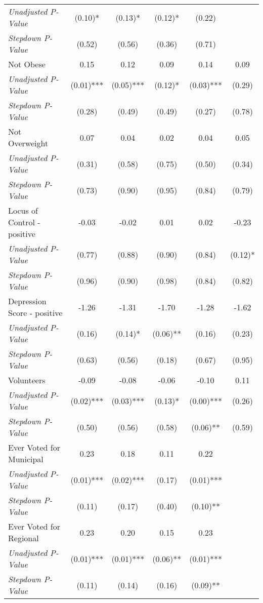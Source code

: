 \begin{tabular}{l c c c c c}
\quad \textit{Unadjusted P-Value} & (0.10)* & (0.13)* & (0.12)* & (0.22) & \\
\quad \textit{Stepdown P-Value} & (0.52) & (0.56) & (0.36) & (0.71) & \\
Not Obese & 0.15 & 0.12 & 0.09 & 0.14 & 0.09 \\
\quad \textit{Unadjusted P-Value} & (0.01)*** & (0.05)*** & (0.12)* & (0.03)*** & (0.29) \\
\quad \textit{Stepdown P-Value} & (0.28) & (0.49) & (0.49) & (0.27) & (0.78) \\
Not Overweight & 0.07 & 0.04 & 0.02 & 0.04 & 0.05 \\
\quad \textit{Unadjusted P-Value} & (0.31) & (0.58) & (0.75) & (0.50) & (0.34) \\
\quad \textit{Stepdown P-Value} & (0.73) & (0.90) & (0.95) & (0.84) & (0.79) \\
Locus of Control - positive & -0.03 & -0.02 & 0.01 & 0.02 & -0.23 \\
\quad \textit{Unadjusted P-Value} & (0.77) & (0.88) & (0.90) & (0.84) & (0.12)* \\
\quad \textit{Stepdown P-Value} & (0.96) & (0.90) & (0.98) & (0.84) & (0.82) \\
Depression Score - positive & -1.26 & -1.31 & -1.70 & -1.28 & -1.62 \\
\quad \textit{Unadjusted P-Value} & (0.16) & (0.14)* & (0.06)** & (0.16) & (0.23) \\
\quad \textit{Stepdown P-Value} & (0.63) & (0.56) & (0.18) & (0.67) & (0.95) \\
Volunteers & -0.09 & -0.08 & -0.06 & -0.10 & 0.11 \\
\quad \textit{Unadjusted P-Value} & (0.02)*** & (0.03)*** & (0.13)* & (0.00)*** & (0.26) \\
\quad \textit{Stepdown P-Value} & (0.50) & (0.56) & (0.58) & (0.06)** & (0.59) \\
Ever Voted for Municipal & 0.23 & 0.18 & 0.11 & 0.22 & \\
\quad \textit{Unadjusted P-Value} & (0.01)*** & (0.02)*** & (0.17) & (0.01)*** & \\
\quad \textit{Stepdown P-Value} & (0.11) & (0.17) & (0.40) & (0.10)** & \\
Ever Voted for Regional & 0.23 & 0.20 & 0.15 & 0.23 & \\
\quad \textit{Unadjusted P-Value} & (0.01)*** & (0.01)*** & (0.06)** & (0.01)*** & \\
\quad \textit{Stepdown P-Value} & (0.11) & (0.14) & (0.16) & (0.09)** & \\

\end{tabular}
